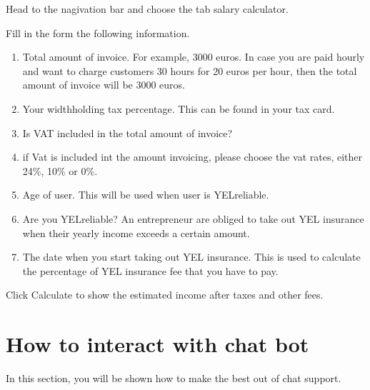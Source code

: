 \documentclass[letterpaper,10pt,english]{sphinxmanual}
\begin{document}
\sphinxAtStartPar
Head to the nagivation bar and choose the tab salary calculator.

\noindent{}

\sphinxAtStartPar
Fill in the form the following information.
\begin{enumerate}
%
\item {} 
\sphinxAtStartPar
Total amount of invoice. For example, 3000 euros. In case you are paid hourly and want to charge customers 30 hours for 20 euros per hour, then the total amount of invoice will be 3000 euros.

\item {} 
\sphinxAtStartPar
Your widthholding tax percentage. This can be found in your tax card.

\item {} 
\sphinxAtStartPar
Is VAT included in the total amount of invoice?

\item {} 
\sphinxAtStartPar
if Vat is included int the amount invoicing, please choose the vat rates, either 24\%, 10\% or 0\%.

\item {} 
\sphinxAtStartPar
Age of user. This will be used when user is YEL\sphinxhyphen{}reliable.

\item {} 
\sphinxAtStartPar
Are you YEL\sphinxhyphen{}reliable? An entrepreneur are obliged to take out YEL insurance when their yearly income exceeds a certain amount.

\item {} 
\sphinxAtStartPar
The date when you start taking out YEL insurance. This is used to calculate the percentage of YEL insurance fee that you have to pay.

\end{enumerate}

\sphinxAtStartPar
Click Calculate to show the estimated income after taxes and other fees.

\noindent{}

\sphinxstepscope


\chapter{How to interact with chat bot}
\label{\detokenize{pages/chatbot:how-to-interact-with-chat-bot}}\label{\detokenize{pages/chatbot::doc}}
\sphinxAtStartPar
In this section, you will be shown how to make the best out of chat support.
\end{document}
